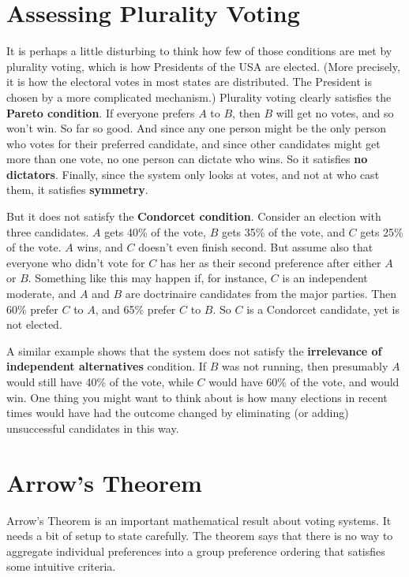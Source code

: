 \documentclass[openany]{book}
\begin{document}
\section{Assessing Plurality Voting}
It is perhaps a little disturbing to think how few of those conditions are met by plurality voting, which is how Presidents of the USA are elected. (More precisely, it is how the electoral votes in most states are distributed. The President is chosen by a more complicated mechanism.) Plurality voting clearly satisfies the \textbf{Pareto condition}. If everyone prefers $A$ to $B$, then $B$ will get no votes, and so won't win. So far so good. And since any one person might be the only person who votes for their preferred candidate, and since other candidates might get more than one vote, no one person can dictate who wins. So it satisfies \textbf{no dictators}. Finally, since the system only looks at votes, and not at who cast them, it satisfies \textbf{symmetry}.

But it does not satisfy the \textbf{Condorcet condition}. Consider an election with three candidates. $A$ gets 40\% of the vote, $B$ gets 35\% of the vote, and $C$ gets 25\% of the vote. $A$ wins, and $C$ doesn't even finish second. But assume also that everyone who didn't vote for $C$ has her as their second preference after either $A$ or $B$. Something like this may happen if, for instance, $C$ is an independent moderate, and $A$ and $B$ are doctrinaire candidates from the major parties. Then 60\% prefer $C$ to $A$, and 65\% prefer $C$ to $B$. So $C$ is a Condorcet candidate, yet is not elected.

A similar example shows that the system does not satisfy the \textbf{irrelevance of independent alternatives} condition. If $B$ was not running, then presumably $A$ would still have 40\% of the vote, while $C$ would have 60\% of the vote, and would win. One thing you might want to think about is how many elections in recent times would have had the outcome changed by eliminating (or adding) unsuccessful candidates in this way. 

\section{Arrow's Theorem}

Arrow's Theorem is an important mathematical result about voting systems. It needs a bit of setup to state carefully. The theorem says that there is no way to aggregate individual preferences into a group preference ordering that satisfies some intuitive criteria.
\end{document}
